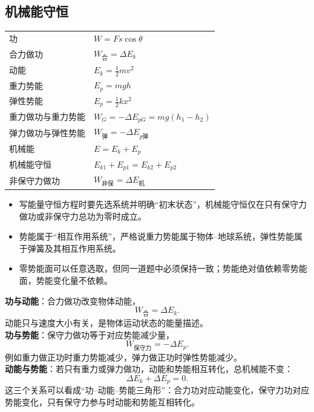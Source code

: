 
\subsection{机械能守恒}
\begin{tabularx}{\columnwidth}{XX}
  功&$W=Fs\cos\theta$\\
  合力做功&$W_{\text{合}}=\Delta E_k$\\
  动能&$E_k=\frac12mv^2$\\
  重力势能&$E_p=mgh$\\
  弹性势能&$E_p=\frac12kx^2$\\
  重力做功与重力势能&$W_G=-\Delta E_{pG}=mg(h_1-h_2)$\\
  弹力做功与弹性势能&$W_{\text{弹}}=-\Delta E_{p\text{弹}}$\\
  机械能&$E=E_k+E_p$\\
  机械能守恒&$E_{k1}+E_{p1}=E_{k2}+E_{p2}$\\
  非保守力做功&$W_{\text{非保}}=\Delta E_{\text{机}}$\\
\end{tabularx}

\begin{formulanotebox}
\begin{itemize}[leftmargin=1.5em]
  \item 写能量守恒方程时要先选系统并明确“初末状态”，机械能守恒仅在只有保守力做功或非保守力总功为零时成立。
  \item 势能属于“相互作用系统”，严格说重力势能属于物体--地球系统，弹性势能属于弹簧及其相互作用系统。
  \item 零势能面可以任意选取，但同一道题中必须保持一致；势能绝对值依赖零势能面，势能变化量不依赖。
\end{itemize}
\end{formulanotebox}

\begin{keypointbox}[title={\strut\textcolor{white}{\bfseries 重点知识点：功、动能、势能三角关系}}]
\textbf{功与动能}：合力做功改变物体动能，
\[
  W_{\text{合}}=\Delta E_k.
\]
动能只与速度大小有关，是物体运动状态的能量描述。\\

\textbf{功与势能}：保守力做功等于对应势能减少量，
\[
  W_{\text{保守力}}=-\Delta E_p.
\]
例如重力做正功时重力势能减少，弹力做正功时弹性势能减少。\\

\textbf{动能与势能}：若只有重力或弹力做功，动能和势能相互转化，总机械能不变：
\[
  \Delta E_k+\Delta E_p=0.
\]
这三个关系可以看成“功--动能--势能三角形”：合力功对应动能变化，保守力功对应势能变化，只有保守力参与时动能和势能互相转化。
\end{keypointbox}

